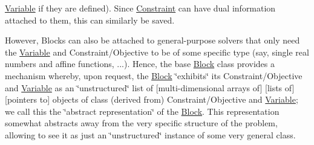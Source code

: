 \mbox{\hyperlink{class_s_m_spp__di__unipi__it_1_1_variable}{Variable}} if they are defined). Since \mbox{\hyperlink{class_s_m_spp__di__unipi__it_1_1_constraint}{Constraint}} can have dual information attached to them, this can similarly be saved.

However, Blocks can also be attached to general-\/purpose solvers that only need the \mbox{\hyperlink{class_s_m_spp__di__unipi__it_1_1_variable}{Variable}} and Constraint/\+Objective to be of some specific type (say, single real numbers and affine functions, ...). Hence, the base \mbox{\hyperlink{class_s_m_spp__di__unipi__it_1_1_block}{Block}} class provides a mechanism whereby, upon request, the \mbox{\hyperlink{class_s_m_spp__di__unipi__it_1_1_block}{Block}} \char`\"{}exhibits\char`\"{} its Constraint/\+Objective and \mbox{\hyperlink{class_s_m_spp__di__unipi__it_1_1_variable}{Variable}} as an \char`\"{}unstructured\char`\"{} list of \mbox{[}multi-\/dimensional arrays of\mbox{]} \mbox{[}lists of\mbox{]} \mbox{[}pointers to\mbox{]} objects of class (derived from) Constraint/\+Objective and \mbox{\hyperlink{class_s_m_spp__di__unipi__it_1_1_variable}{Variable}}; we call this the \char`\"{}abstract representation\char`\"{} of the \mbox{\hyperlink{class_s_m_spp__di__unipi__it_1_1_block}{Block}}. This representation somewhat abstracts away from the very specific structure of the problem, allowing to see it as just an \char`\"{}unstructured\char`\"{} instance of some very general class.

